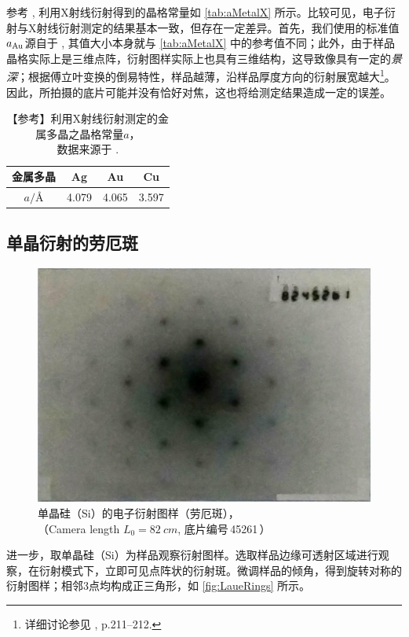 \documentclass[aps,pre,12pt,preprint,%
	onecolumn,showpacs,showkeys,nofootinbib]{revtex4-2}
\begin{document}
	参考 \cite{PhysRev.25.753}, 利用X射线衍射得到的晶格常量如 \autoref{tab:aMetalX} 所示。比较可见，电子衍射与X射线衍射测定的结果基本一致，但存在一定差异。首先，我们使用的标准值$a_{\textup{Au}}$源自于 \cite{textbook}, 其值大小本身就与 \autoref{tab:aMetalX} 中的参考值不同；此外，由于样品晶格实际上是三维点阵，衍射图样实际上也具有三维结构，这导致像具有一定的\textit{景深}；根据傅立叶变换的倒易特性，样品越薄，沿样品厚度方向的衍射展宽越大\footnote{%
		详细讨论参见 \cite{textbook}, p.\numrange{211}{212}. 
		}。因此，所拍摄的底片可能并没有恰好对焦，这也将给测定结果造成一定的误差。
	
	\begin{table}[!ht]
	  \caption{【参考】利用X射线衍射测定的金属多晶之晶格常量$a$，\\
	  	数据来源于 \cite{PhysRev.25.753}. }
	\begin{tabularx}{.6\linewidth}{*4{C{1}}}
	\toprule\midrule
		金属多晶 & Ag & Au & Cu \\
	\midrule
		$a / \si{\angstrom}$ & 4.079 & 4.065 & 3.597 \\
	\midrule\bottomrule
	\end{tabularx}
	\label{tab:aMetalX}
	\vspace{-3ex}
	\end{table}
\subsection{单晶衍射的劳厄斑}
	\begin{figure}[!ht]
	\centering
	\includegraphics[width=.7\linewidth]{LaueSpots}
	\caption{单晶硅（Si）的电子衍射图样（劳厄斑），\\
		（Camera length $L_0 = \SI{82}{cm}$, 
		底片编号\textnumero\,45261\,）}
	\label{fig:LaueRings}
	\end{figure}
	
	进一步，取单晶硅（Si）为样品观察衍射图样。选取样品边缘可透射区域进行观察，在衍射模式下，立即可见点阵状的衍射斑。微调样品的倾角，得到旋转对称的衍射图样；相邻3点均构成正三角形，如 \autoref{fig:LaueRings} 所示。
	
\end{document}
